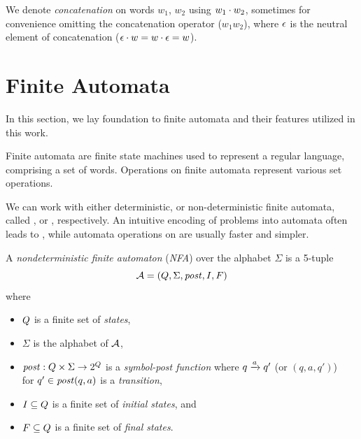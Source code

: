 We denote \emph{concatenation} on words $w_1$, $w_2$ using $w_1 \cdot w_2$, sometimes for convenience omitting the concatenation operator ($w_1w_2$), where $\epsilon$ is the neutral element of concatenation ($\epsilon \cdot w = w \cdot \epsilon = w$).

\section{Finite Automata}

In this section, we lay foundation to finite automata and their features utilized in this work.

Finite automata are finite state machines used to represent a regular language, comprising a set of words.
Operations on finite automata represent various set operations.

We can work with either deterministic, or non-deterministic finite automata, called \dfa, or \nfa, respectively.
An intuitive encoding of problems into automata often leads to \nfas, while automata operations on \dfas are usually faster and simpler.


\begin{definition} \hfill \newline
A \emph{nondeterministic finite automaton} (\emph{NFA}) over the alphabet $\Sigma$ is a 5-tuple $$\mathcal{A} = (Q, \Sigma, \mathit{post}, I, F)$$ where
\begin{itemize}
    \item $Q$ is a finite set of \emph{states},
    \item $\Sigma$ is the alphabet of $\mathcal{A}$,
    \item $\mathit{post}: Q \times \Sigma \rightarrow 2^{Q}$ is a \emph{symbol-post function} where ${q} \xrightarrow{{a}} {q'}$ (or $(q, a, q')$)\\for $q' \in \mathit{post}(q, a)$ is a \emph{transition},
    \item $I \subseteq Q$ is a finite set of \emph{initial states}, and
    \item $F \subseteq Q$ is a finite set of \emph{final states}.
\end{itemize}
\end{definition}

